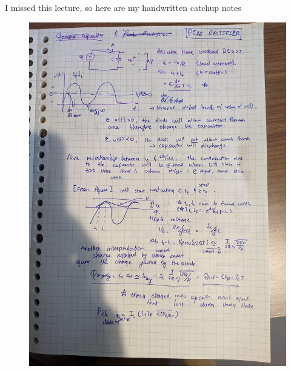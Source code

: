 \documentclass[../notes.tex]{subfiles}
\begin{document}
I missed this lecture, so here are my handwritten catchup notes
\begin{fullpage}
	\begin{figure}[H]
		\centering
		\includegraphics[width=\linewidth]{img/image_2022-09-29-16-36-40.png}
	\end{figure}
\end{fullpage}
\end{document}
